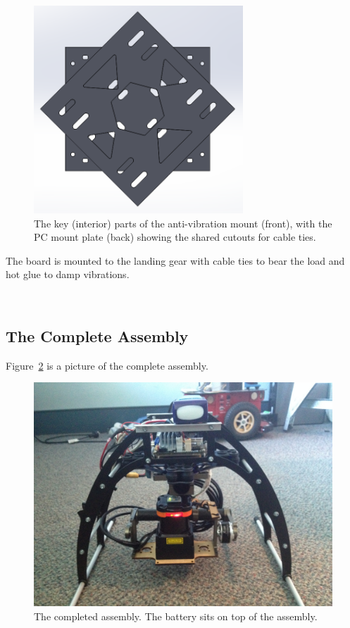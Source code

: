 \documentclass[12pt,oneside,a4paper]{book}
\begin{document}
\begin{figure}[h]
  \centering
  \includegraphics[width=0.7\textwidth]{figs/pc-avm}
  \caption{The key (interior) parts of the anti-vibration mount (front), with the PC mount plate (back) showing the shared cutouts for cable ties.}
  \label{fig:pc-avm-mount}
\end{figure}
The board is mounted to the landing gear with cable ties to bear the
load and hot glue to damp vibrations.

\newpage~\newpage
\subsection{The Complete Assembly}
\label{sec:concluding-remarks}

Figure~\ref{fig:mk2} is a picture of the complete assembly.

\begin{figure}[h!]
  \centering
  \includegraphics[width=\textwidth]{figs/mk2}
  \caption{The completed assembly. The battery sits on top of the assembly.}
  \label{fig:mk2}
\end{figure}
\end{document}
